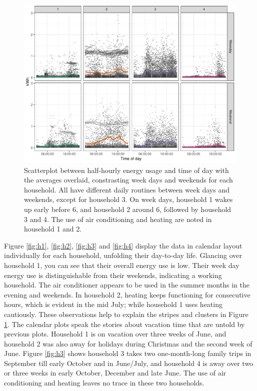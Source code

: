 \documentclass[12pt]{article}
\begin{document}
\begin{figure}

{\centering \includegraphics[width=\textwidth]{figure/hod-1} 

}

\caption{Scatterplot between half-hourly energy usage and time of day with the averages overlaid, constrasting week days and weekends for each household. All have different daily routines between week days and weekends, except for household 3. On week days, household 1 wakes up early before 6, and household 2 around 6, followed by household 3 and 4. The use of air conditioning and heating are noted in household 1 and 2.}\label{fig:hod}
\end{figure}

Figure \ref{fig:h1}, \ref{fig:h2}, \ref{fig:h3} and \ref{fig:h4} display
the data in calendar layout individually for each household, unfolding
their day-to-day life. Glancing over household 1, you can see that their
overall energy use is low. Their week day energy use is distinguishable
from their weekends, indicating a working household. The air conditioner
appears to be used in the summer months in the evening and weekends. In
household 2, heating keeps functioning for consecutive hours, which is
evident in the mid July; while household 1 uses heating cautiously.
These observations help to explain the stripes and clusters in Figure
\ref{fig:hod}. The calendar plots speak the stories about vacation time
that are untold by previous plots. Household 1 is on vacation over three
weeks of June, and household 2 was also away for holidays during
Christmas and the second week of June. Figure \ref{fig:h3} shows
household 3 takes two one-month-long family trips in September till
early October and in June/July, and household 4 is away over two or
three weeks in early October, December and late June. The use of air
conditioning and heating leaves no trace in these two households.
\end{document}
